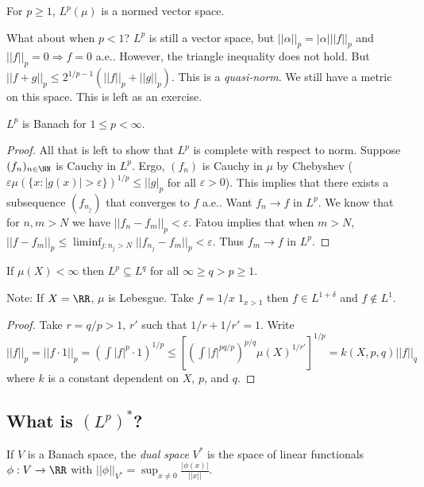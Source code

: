 \documentclass{../uva7310}
\begin{document}
\begin{corollary}
    For $p\geq 1$, $L^p(\mu)$ is a normed vector space.
\end{corollary}

What about when $p<1$? $L^p$ is still a vector space, but $||\alpha||_p=|\alpha|||f||_p$ and $||f||_p=0\Rightarrow f=0$ a.e..
However, the triangle inequality does not hold. But $||f+g||_p\leq 2^{1/p-1} (||f||_p+||g||_p)$. This is a \textit{quasi-norm}.
We still have a metric on this space. This is left as an exercise.

\begin{thm}
    $L^p$ is Banach for $1\leq p< \infty$.
\end{thm}
\begin{proof}
    All that is left to show that $L^p$ is complete with respect to norm. Suppose $(f_n)_{n\in\NN}$ is Cauchy in $L^p$. Ergo,
    $(f_n)$ is Cauchy in $\mu$ by Chebyshev ($\varepsilon \mu(\{x:|g(x)|>\varepsilon\})^{1/p}\leq ||g|_p$ for all $\varepsilon>0$).
    This implies that there exists a subsequence $(f_{n_j})$ that converges to $f$ a.e.. Want $f_n\to f$ in $L^p$.
    We know that for $n,m>N$ we have $||f_n-f_m||_p<\varepsilon$. Fatou implies that when $m>N$,
    $||f-f_m||_p \leq \liminf_{j:n_j>N} ||f_{n_j}-f_m||_p<\varepsilon$. Thus $f_m\to f$ in $L^p$.
\end{proof}

\begin{proposition}
    If $\mu(X)<\infty$ then $L^p\subseteq L^q$ for all $\infty\geq q>p\geq 1$.
\end{proposition}

Note: If $X=\RR$, $\mu$ is Lebesgue. Take $f=1/x\; 1_{x>1}$ then $f\in L^{1+\delta}$ and $f\notin L^1$.

\begin{proof}
    Take $r=q/p>1$, $r'$ such that $1/r+1/r'=1$.
    Write
    $||f||_p=||f\cdot 1||_p=\left(\int |f|^p\cdot 1\right)^{1/p}\leq \left[\left(\int|f|^{pq/p}\right)^{p/q}\mu(X)^{1/r'} \right]^{1/p}=k(X,p,q)||f||_q$
    where $k$ is a constant dependent on $X$, $p$, and $q$.
\end{proof}

\subsection{What is $(L^p)^*$?}

\begin{definition}
    If $V$ is a Banach space, the \textit{dual space} $V^*$ is the space of linear functionals $\phi:V\rightarrow\RR$ with
    $||\phi||_{V^*}=\sup_{x\neq 0}\frac{|\phi(x)|}{||x||}$.
\end{definition}
\end{document}
